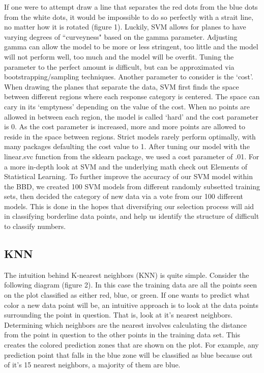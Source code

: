 \documentclass[11pt, oneside]{article}   	%
\begin{document}
If one were to attempt draw a line that separates the red dots from the blue dots from the white dots, it would be impossible to do so perfectly with a strait line, no matter how it is rotated (figure 1). Luckily, SVM allows for planes to have varying degrees of ``curveyness" based on the gamma parameter. Adjusting gamma can allow the model to be more or less stringent, too little and the model will not perform well, too much and the model will be overfit. Tuning the parameter to the perfect amount is difficult, but can be approximated via bootstrapping/sampling techniques. Another parameter to consider is the `cost'. When drawing the planes that separate the data, SVM first finds the space between different regions where each response category is centered. The space can cary in its `emptyness' depending on the value of the cost. When no points are allowed in between each region, the model is called `hard' and the cost parameter is 0. As the cost parameter is increased, more and more points are allowed to reside in the space between regions. Strict models rarely perform optimally, with many packages defaulting the cost value to 1. After tuning our model with the linear.svc function from the sklearn package, we used a cost parameter of .01. For a more in-depth look at SVM and the underlying math check out Elements of Statistical Learning. \cite{SVMBook}
To further improve the accuracy of our SVM model within the BBD, we created 100 SVM models from different randomly subsetted training sets, then decided the category of new data via a vote from our 100 different models. This is done in the hopes that diversifying our selection process will aid in classifying borderline data points, and help us identify the structure of difficult to classify numbers.
\subsection{KNN}
The intuition behind K-nearest neighbors (KNN) is quite simple. Consider the following diagram (figure 2). In this case the training data are all the points seen on the plot classified as either red, blue, or green. If one wants to predict what color a new data point will be, an intuitive approach is to look at the data points surrounding the point in question. That is, look at it's nearest neighbors. Determining which neighbors are the nearest involves calculating the distance from the point in question to the other points in the training data set. This creates the colored prediction zones that are shown on the plot. For example, any prediction point that falls in the blue zone will be classified as blue because out of it's 15 nearest neighbors, a majority of them are blue. 
\end{document}
